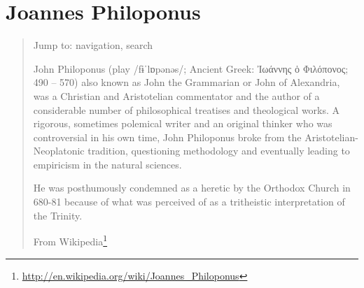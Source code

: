 \documentclass[12pt,letterpaper,twoside,final]{memoir}
\begin{document}
\section{Joannes Philoponus}
\blockquote[From Wikipedia\footnote{\url{http://en.wikipedia.org/wiki/Joannes_Philoponus}}]{
Jump to: navigation, search

John Philoponus (play /fɨˈlɒpənəs/; Ancient Greek: Ἰωάννης ὁ Φιλόπονος; 490 – 570) also known as John the Grammarian or John of Alexandria, was a Christian and Aristotelian commentator and the author of a considerable number of philosophical treatises and theological works. A rigorous, sometimes polemical writer and an original thinker who was controversial in his own time, John Philoponus broke from the Aristotelian-Neoplatonic tradition, questioning methodology and eventually leading to empiricism in the natural sciences.

He was posthumously condemned as a heretic by the Orthodox Church in 680-81 because of what was perceived of as a tritheistic interpretation of the Trinity.}
\end{document}
